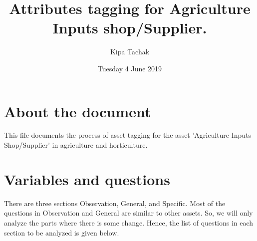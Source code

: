 \documentclass[oneside,twocolumn]{article}
\title{Attributes tagging for Agriculture Inputs shop/Supplier.}
\author{Kipa Tachak}
\date{Tuesday 4 June 2019}
\begin{document}
               \maketitle

               \section{About the document}
               This file documents the process of asset tagging for the asset
               'Agriculture Inputs Shop/Supplier' in agriculture and horticulture.
               \section{Variables and questions}
               There are three sections Observation, General, and Specific. Most of
               the questions in Observation and General are similar to other
               assets. So, we will only analyze the parts where there is some
               change. Hence, the list of questions in each section to be
               analyzed is given below.
\end{document}
